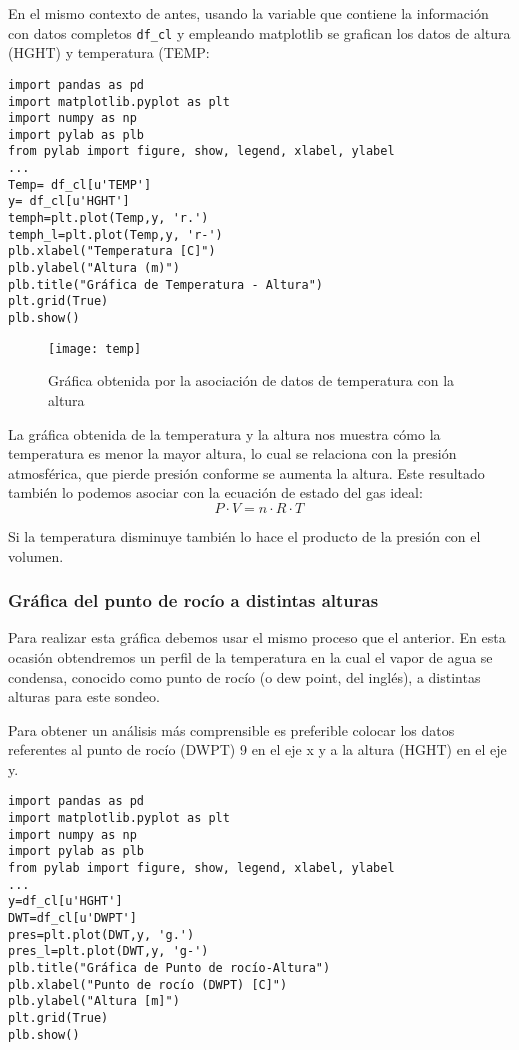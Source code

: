 En el mismo contexto de antes, usando la variable que contiene la información con datos completos \texttt{df\_cl} y empleando \textsf{matplotlib} se grafican los datos de altura (HGHT) y temperatura (TEMP:

\begin{verbatim}
import pandas as pd
import matplotlib.pyplot as plt
import numpy as np
import pylab as plb
from pylab import figure, show, legend, xlabel, ylabel
...
Temp= df_cl[u'TEMP']
y= df_cl[u'HGHT']
temph=plt.plot(Temp,y, 'r.')
temph_l=plt.plot(Temp,y, 'r-')
plb.xlabel("Temperatura [C]")
plb.ylabel("Altura (m)")
plb.title("Gráfica de Temperatura - Altura")
plt.grid(True)
plb.show()
\end{verbatim}
\pagebreak
\begin{figure}[p h]
\texttt{[image: temp]}
\caption{Gráfica obtenida por la asociación de datos de temperatura con la altura}
\label{temps}
\end{figure}
La gráfica obtenida de la temperatura y la altura nos muestra cómo la temperatura es menor la mayor altura, lo cual se relaciona con la presión atmosférica, que pierde presión conforme se aumenta la altura. Este resultado también lo podemos asociar con la ecuación de estado del gas ideal:
\begin{equation}
\displaystyle P\cdot V=n\cdot R\cdot T\,\!
\end{equation}

\noindent Si la temperatura disminuye también lo hace el producto de la presión con el volumen.

\newpage
\subsubsection{Gráfica del punto de rocío a distintas alturas}
\noindent Para realizar esta gráfica debemos usar el mismo proceso que el anterior.  En esta ocasión obtendremos un perfil de la temperatura en la cual el vapor de agua se condensa, conocido como punto de rocío (o dew point, del inglés), a distintas alturas para este sondeo.

Para obtener un análisis más comprensible es preferible colocar los datos referentes al punto de rocío (DWPT) 9 en el eje x y a la altura (HGHT) en el eje y.

\begin{verbatim}
import pandas as pd
import matplotlib.pyplot as plt
import numpy as np
import pylab as plb
from pylab import figure, show, legend, xlabel, ylabel
...
y=df_cl[u'HGHT']
DWT=df_cl[u'DWPT']
pres=plt.plot(DWT,y, 'g.')
pres_l=plt.plot(DWT,y, 'g-')
plb.title("Gráfica de Punto de rocío-Altura")
plb.xlabel("Punto de rocío (DWPT) [C]")
plb.ylabel("Altura [m]")
plt.grid(True)
plb.show()
\end{verbatim}

